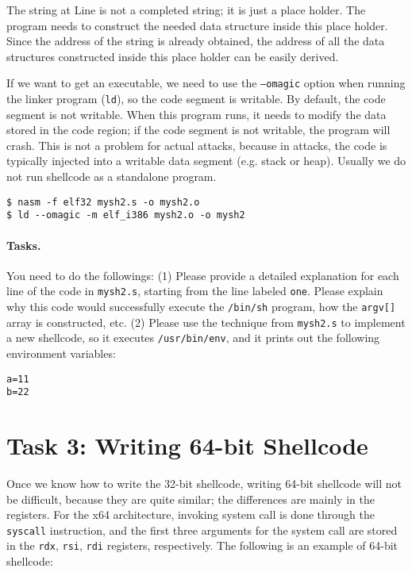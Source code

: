 The string at Line  is not a completed string; it 
is just a place holder. 
The program needs to construct the needed data structure
inside this place holder. Since the address of the string
is already obtained, the address of all the data 
structures constructed inside this place holder can
be easily derived. 


If we want to get an executable, we need to use 
the \texttt{--omagic} option when running the 
linker program (\texttt{ld}), so 
the code segment is writable. 
By default, the code segment is not writable.
When this program runs, it needs to modify the data stored
in the code region; if the code segment is not 
writable, the program will crash. 
This is not a problem for actual attacks, because
in attacks, the code is typically injected into a writable data 
segment (e.g. stack or heap). Usually we do not run shellcode 
as a standalone program. 


\begin{lstlisting}
$ nasm -f elf32 mysh2.s -o mysh2.o
$ ld --omagic -m elf_i386 mysh2.o -o mysh2
\end{lstlisting}


\paragraph{Tasks.} You need to do the followings:
(1) Please provide a detailed explanation for each line of the 
code in \texttt{mysh2.s}, starting from the line labeled \texttt{one}.
Please explain why this code would successfully execute 
the \texttt{/bin/sh} program, how the \texttt{argv[]} array is
constructed, etc. 
(2) Please use the technique from \texttt{mysh2.s} to 
implement a new shellcode, so it 
executes \texttt{/usr/bin/env}, and it prints out 
the following environment variables: 

\begin{lstlisting}
a=11
b=22
\end{lstlisting}


\section{Task 3: Writing 64-bit Shellcode}

Once we know how to write the 32-bit shellcode, writing 64-bit
shellcode will not be difficult, because they are quite similar;
the differences are mainly in the registers. 
For the x64 architecture, invoking system call is done through
the \texttt{syscall} instruction, and the first three arguments 
for the system call are stored in the \texttt{rdx}, \texttt{rsi}, 
\texttt{rdi} registers, respectively. 
The following is an example of 64-bit shellcode:

